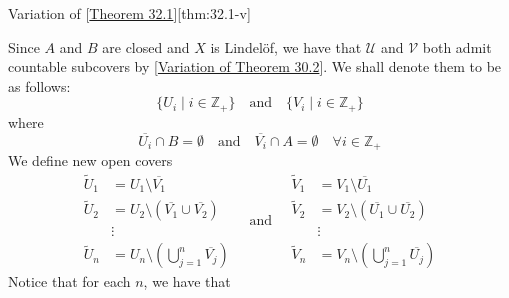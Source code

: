 \begin{thmBox}{Variation of [\hyperlink{thm:32.1}{Theorem 32.1}]}[thm:32.1-v]
\begin{proofBox}
        Since \( A \) and \( B \) are closed and \( X \) is Lindel\"{o}f, we have that 
        \( \mathcal{U} \) and \( \mathcal{V} \) both admit countable subcovers by 
        [\hyperlink{thm:30.5}{Variation of Theorem 30.2}].
        We shall denote them to be as follows:
        \begin{equation*}
            \{ U_{ i } \mid i \in \mathbb{Z}_{ + } \}
            \quad \mathrm{and} \quad 
            \{ V_{ i } \mid i \in \mathbb{Z}_{ + } \}
        \end{equation*}
        where 
        \begin{equation*}
            \overline{ U_{ i } } \cap B = \emptyset
            \quad \mathrm{and} \quad 
            \overline{ V_{ i } } \cap A = \emptyset
            \quad \forall i \in \mathbb{Z}_{ + }
        \end{equation*}
        We define new open covers
        \begin{equation*}
            \begin{aligned}
                \tilde{U}_{ 1 }
                &=
                U_{ 1 } \setminus \overline{ V_{ 1 } }
                \\ 
                \tilde{U}_{ 2 }
                &=
                U_{ 2 } \setminus ( \overline{ V_{ 1 } } \cup \overline{ V_{ 2 } } )
                \\ 
                &\vdots
                \\
                \tilde{U}_{ n }
                &=
                U_{ n } \setminus 
                \left( \bigcup_{ j = 1 }^{ n } \overline{ V_{ j } } \right)
            \end{aligned}
            \quad \mathrm{and} \quad 
            \begin{aligned}
                \tilde{V}_{ 1 }
                &=
                V_{ 1 } \setminus \overline{ U_{ 1 } }
                \\
                \tilde{V}_{ 2 }
                &=
                V_{ 2 } \setminus ( \overline{ U_{ 1 } } \cup \overline{ U_{ 2 } } )
                \\ 
                &\vdots
                \\
                \tilde{V}_{ n }
                &=
                V_{ n } \setminus 
                \left( \bigcup_{ j = 1 }^{ n } \overline{ U_{ j } } \right)
            \end{aligned}
        \end{equation*}
        Notice that for each \( n \), we have that 

\end{proofBox}
\end{thmBox}
